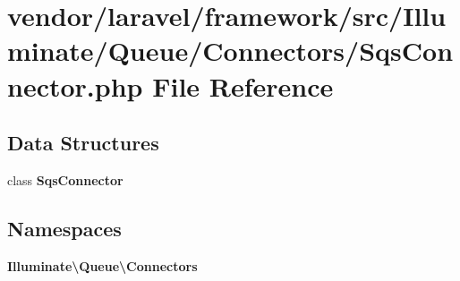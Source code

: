 \section{vendor/laravel/framework/src/\+Illuminate/\+Queue/\+Connectors/\+Sqs\+Connector.php File Reference}
\label{_sqs_connector_8php}
\subsection*{Data Structures}
\begin{DoxyCompactItemize}
\item 
class {\bf Sqs\+Connector}
\end{DoxyCompactItemize}
\subsection*{Namespaces}
\begin{DoxyCompactItemize}
\item 
 {\bf Illuminate\textbackslash{}\+Queue\textbackslash{}\+Connectors}
\end{DoxyCompactItemize}

